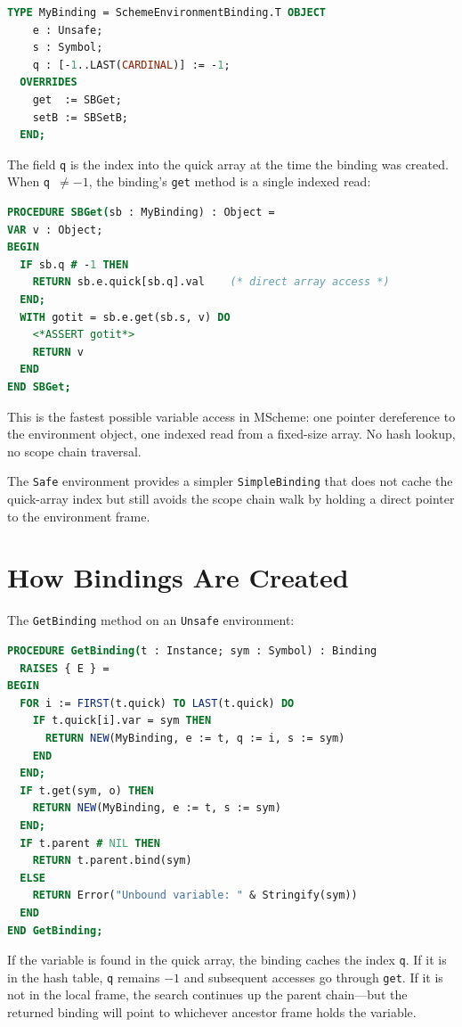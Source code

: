 \documentclass[12pt]{report}
\begin{document}
\begin{lstlisting}[language=Modula3]
TYPE MyBinding = SchemeEnvironmentBinding.T OBJECT
    e : Unsafe;
    s : Symbol;
    q : [-1..LAST(CARDINAL)] := -1;
  OVERRIDES
    get  := SBGet;
    setB := SBSetB;
  END;
\end{lstlisting}

The field \texttt{q} is the index into the quick array at the time
the binding was created.  When \texttt{q $\neq -1$}, the binding's
\texttt{get} method is a single indexed read:

\begin{lstlisting}[language=Modula3]
PROCEDURE SBGet(sb : MyBinding) : Object =
VAR v : Object;
BEGIN
  IF sb.q # -1 THEN
    RETURN sb.e.quick[sb.q].val    (* direct array access *)
  END;
  WITH gotit = sb.e.get(sb.s, v) DO
    <*ASSERT gotit*>
    RETURN v
  END
END SBGet;
\end{lstlisting}

This is the fastest possible variable access in MScheme: one pointer
dereference to the environment object, one indexed read from a
fixed-size array.  No hash lookup, no scope chain traversal.

The \texttt{Safe} environment provides a simpler \texttt{SimpleBinding}
that does not cache the quick-array index but still avoids the scope
chain walk by holding a direct pointer to the environment frame.

\section{How Bindings Are Created}

The \texttt{GetBinding} method on an \texttt{Unsafe} environment:

\begin{lstlisting}[language=Modula3]
PROCEDURE GetBinding(t : Instance; sym : Symbol) : Binding
  RAISES { E } =
BEGIN
  FOR i := FIRST(t.quick) TO LAST(t.quick) DO
    IF t.quick[i].var = sym THEN
      RETURN NEW(MyBinding, e := t, q := i, s := sym)
    END
  END;
  IF t.get(sym, o) THEN
    RETURN NEW(MyBinding, e := t, s := sym)
  END;
  IF t.parent # NIL THEN
    RETURN t.parent.bind(sym)
  ELSE
    RETURN Error("Unbound variable: " & Stringify(sym))
  END
END GetBinding;
\end{lstlisting}

If the variable is found in the quick array, the binding caches the
index \texttt{q}.  If it is in the hash table, \texttt{q} remains
$-1$ and subsequent accesses go through \texttt{get}.  If it is not
in the local frame, the search continues up the parent chain---but
the returned binding will point to whichever ancestor frame holds
the variable.
\end{document}

